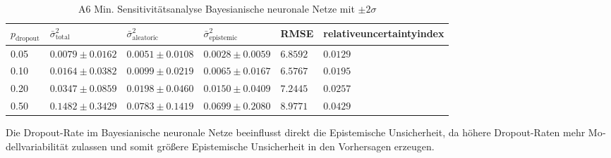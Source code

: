 \begin{otherlanguage}{ngerman}
\begin{table}[!htbp]
\centering
\footnotesize
\begin{tabularx}{\textwidth}{|X|X|X|X|X|X|}
\hline
\vspace{0.15em}$p_{\text{dropout}}$\vspace{0.25em} 
&\vspace{0.15em} $\bar{\sigma}^2_{\text{total}}$\vspace{0.25em}
&\vspace{0.15em} $\bar{\sigma}^2_{\text{aleatoric}}$\vspace{0.25em}
&\vspace{0.15em} $\bar{\sigma}^2_{\text{epistemic}}$\vspace{0.25em}
&\vspace{0.15em} RMSE \vspace{0.25em}
&\vspace{0.15em} \gls{relativeuncertaintyindex}\vspace{0.25em} \\
\hline
0.05 & $0.0079 \pm 0.0162$ & $0.0051 \pm 0.0108$ & $0.0028 \pm 0.0059$ & $6.8592$ & $0.0129$ \\
\hline
0.10 & $0.0164 \pm 0.0382$ & $0.0099 \pm 0.0219$ & $0.0065 \pm 0.0167$ & $6.5767$ & $0.0195$ \\
\hline
0.20 & $0.0347 \pm 0.0859$ & $0.0198 \pm 0.0460$ & $0.0150 \pm 0.0409$ & $7.2445$ & $0.0257$ \\
\hline
0.50 & $0.1482 \pm 0.3429$ & $0.0783 \pm 0.1419$ & $0.0699 \pm 0.2080$ & $8.9771$ & $0.0429$ \\
\hline
\end{tabularx}
\caption{A6 Min. Sensitivitätsanalyse \gls{Bayesianische neuronale Netze} mit $\pm 2\sigma$}
\label{tab:bnn_results}
\end{table} 

Die Dropout-Rate im \gls{Bayesianische neuronale Netze} beeinflusst direkt die \gls{Epistemische Unsicherheit}, da höhere Dropout-Raten mehr Modellvariabilität zulassen und somit größere \gls{Epistemische Unsicherheit} in den Vorhersagen erzeugen.

\newline


\end{otherlanguage}
